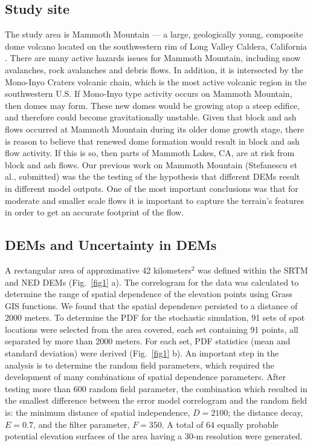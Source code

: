 \documentclass[a4paper,fleqn]{article}
\begin{document}
\subsection{Study site}

The study area is Mammoth Mountain --- a large, geologically young,
composite dome volcano located on the southwestern rim of Long Valley
Caldera, California \citep{Bailey1989}.  There are many active hazards
issues for Mammoth Mountain, including snow avalanches, rock
avalanches and debris flows. In addition, it is intersected by the
Mono-Inyo Craters volcanic chain, which is the most active volcanic
region in the southwestern U.S.  If Mono-Inyo type activity occurs on
Mammoth Mountain, then domes may form.  These new domes would be
growing atop a steep edifice, and therefore could become
gravitationally unstable.  Given that block and ash flows occurred at
Mammoth Mountain during its older dome growth stage, there is reason
to believe that renewed dome formation would result in block and ash
flow activity. If this is so, then parts of Mammoth Lakes, CA, are at
risk from block and ash flows.  Our previous work on Mammoth Mountain
(Stefanescu et al., submitted) was the the testing of the hypothesis
that different DEMs result in different model outputs. One of the most
important conclusions was that for moderate and smaller scale flows it
is important to capture the terrain's features in order to get an
accurate footprint of the flow.

\subsection{DEMs and Uncertainty in DEMs}

A rectangular area of approximative 42 kilometers$^2$ was defined
within the SRTM and NED DEMs (Fig.~\ref{fig1} a). The correlogram for the data 
was calculated to determine the range of spatial dependence of the elevation points using
Grass GIS functions. We found that the spatial dependence persisted to a distance of 2000 meters.
To determine the PDF for the stochastic simulation, 91 sets of spot locations were selected from the 
area covered, each set containing 91 points, all separated by more than 2000 meters. For each set,
PDF statistics (mean and standard deviation) were derived (Fig.~\ref{fig1} b). An important step in
the analysis is to determine the random field parameters, which
required the development of many combinations of spatial dependence
parameters. After testing more than 600 random field parameter, the
combination which resulted in the smallest difference between the
error model correlogram and the random field is: the minimum distance
of spatial independence, $D =2100$; the distance decay, $E = 0.7$, and
the filter parameter, $F =350$. A total of 64 equally probable
potential elevation surfaces of the area having a 30-m resolution were
generated.
\end{document}
